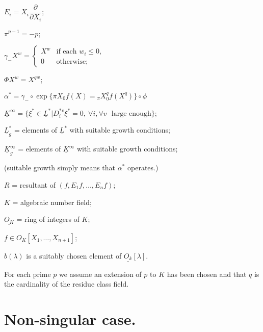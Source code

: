 \smallskip

$E_{i}=X_{i}\dfrac{\partial}{\partial X_{i}}$;

\smallskip

$\pi^{p-1}=-p$;

\smallskip

$\gamma_{-}X^{w}=\begin{cases} X^{w} & \text{if each } w_{i}\leq 0,\\
0 & \text{otherwise;}\end{cases}$

\smallskip

$\Phi X^{w}=X^{qw}$;

\smallskip

$\alpha^{*}=\gamma_{-}\circ \exp \{\pi X_{0}f(X)={}_{\pi}X^{q}_{0}f(X^{q})\}\circ \phi$\pageoriginale

\smallskip

$\underline{K}^{\infty}=\{\xi^{*}\in \underline{L}^{*}|D^{*v}_{i}\xi^{*}=0, \ \forall i, \forall v\text{~ large enough}\}$;

\smallskip

$\underline{L}^{*}_{g}$ = elements of $\underline{L}^{*}$ with suitable growth conditions;

\smallskip

$\underline{K}^{\infty}_{g}$ = elements of $\underline{K}^{\infty}$ with suitable growth conditions;

\smallskip

(suitable growth simply means that $\alpha^{*}$ operates.)

\smallskip

$R$ = resultant of $(f,E_{1}f,\ldots,E_{n}f)$;

\smallskip

$K$ = algebraic number field;

\smallskip

$\underline{O_{K}}$ = ring of integers of $K$;

\smallskip

$f\in \underline{O_{K}}[X_{1},\ldots,X_{n+1}]$;

\smallskip

$b(\lambda)$ is a suitably chosen element of $\underline{O_{k}}[\lambda]$.

\smallskip

For each prime $p$ we assume an extension of $p$ to $K$ has been chosen and that $q$ is the cardinality of the residue class field.

\section{Non-singular case.}\label{art07-sec2}

